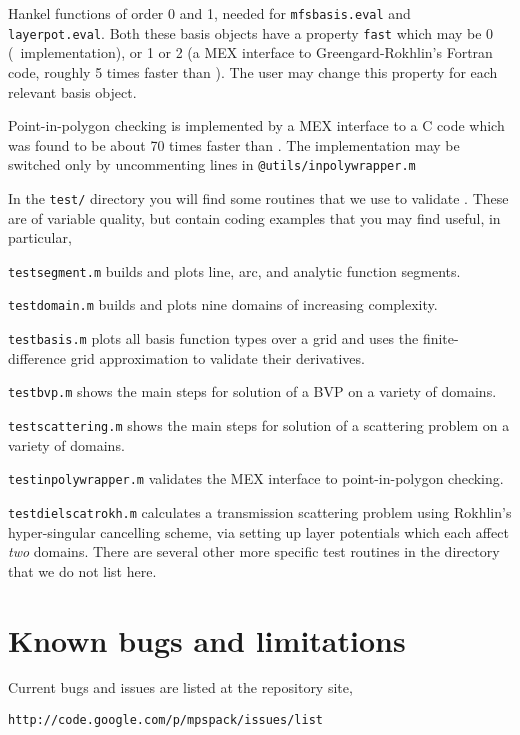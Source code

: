 \documentclass[12pt]{article}
\begin{document}
\item Hankel functions of order 0 and 1, needed for
{\tt mfsbasis.eval} and {\tt layerpot.eval}. Both these basis objects
have a property {\tt fast} which may be 0 (\matlab\ implementation),
or 1 or 2 (a MEX interface to Greengard-Rokhlin's Fortran code,
roughly 5 times faster than \matlab).
The user may change this property for each relevant basis object.

\item Point-in-polygon checking is implemented by a MEX interface
to a C code which was found to be about 70 times faster than
\matlab. The implementation
may be switched only by uncommenting lines
in {\tt @utils/inpolywrapper.m}
\een

In the {\tt test/} directory you will find some routines that
we use to validate \mpspack. These are of variable quality,
but contain coding examples that you may find useful, in particular,
\bi
\item {\tt testsegment.m} builds and plots line, arc, and analytic function
segments.
\item {\tt testdomain.m} builds and plots nine domains of increasing
complexity.
\item {\tt testbasis.m} plots all basis function types over a grid and
uses the finite-difference grid approximation to validate their derivatives.
\item {\tt testbvp.m} shows the main steps for solution of a BVP on
a variety of domains.
\item {\tt testscattering.m} shows the main steps for solution of a 
scattering problem on a variety of domains.
\item {\tt testinpolywrapper.m} validates the MEX interface to point-in-polygon
checking.
\item {\tt testdielscatrokh.m} calculates a transmission scattering problem
using Rokhlin's hyper-singular cancelling scheme, via setting up layer potentials
which each affect {\em two} domains.
\ei
There are several other more specific test routines in the directory
that we do not list here.

\section{Known bugs and limitations}

Current bugs and issues are listed at the repository site,

{\tt http://code.google.com/p/mpspack/issues/list}
\end{document}
